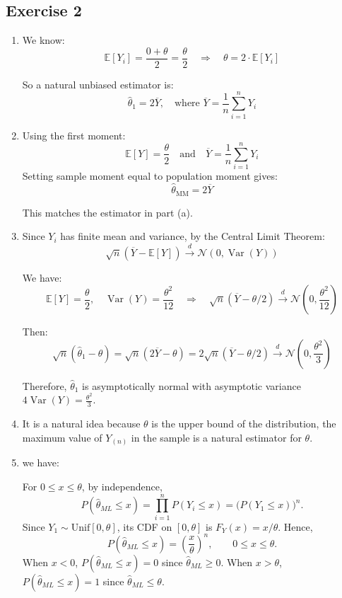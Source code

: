 \documentclass[12pt]{article}
\begin{document}
\begin{flushleft}
\section*{Exercise 2}

\begin{enumerate}[label=(\alph*)]

\item 

We know:
\[
\mathbb{E}[Y_i] = \frac{0 + \theta}{2} = \frac{\theta}{2}
\quad \Rightarrow \quad
\theta = 2 \cdot \mathbb{E}[Y_i]
\]

So a natural unbiased estimator is:
\[
\hat{\theta}_1 = 2 \overline{Y}, \quad \text{where } \overline{Y} = \frac{1}{n} \sum_{i=1}^n Y_i
\]

\item 

Using the first moment:
\[
\mathbb{E}[Y] = \frac{\theta}{2} \quad \text{and} \quad \overline{Y} = \frac{1}{n} \sum_{i=1}^n Y_i
\]
Setting sample moment equal to population moment gives:
\[
\hat{\theta}_{\text{MM}} = 2 \overline{Y}
\]

This matches the estimator in part (a).

\item 

Since \( Y_i \) has finite mean and variance, by the Central Limit Theorem:
\[
\sqrt{n}(\overline{Y} - \mathbb{E}[Y]) \xrightarrow{d} \mathcal{N}\left(0, \operatorname{Var}(Y)\right)
\]

We have:
\[
\mathbb{E}[Y] = \frac{\theta}{2}, \quad \operatorname{Var}(Y) = \frac{\theta^2}{12}
\quad \Rightarrow \quad
\sqrt{n}(\overline{Y} - \theta/2) \xrightarrow{d} \mathcal{N}\left(0, \frac{\theta^2}{12}\right)
\]

Then:
\[
\sqrt{n}(\hat{\theta}_1 - \theta) = \sqrt{n}(2\overline{Y} - \theta) = 2\sqrt{n}(\overline{Y} - \theta/2) \xrightarrow{d} \mathcal{N}\left(0, \frac{\theta^2}{3} \right)
\]

Therefore, \( \hat{\theta}_1 \) is asymptotically normal with asymptotic variance \( 4\operatorname{Var}(Y) = \frac{\theta^2}{3} \).

\item It is a natural idea because $\theta$ is the upper bound of the distribution, the maximum value of $Y_{(n)}$ in the sample is a natural estimator for $\theta$.

\item we have:


For $0\le x\le \theta$, by independence,
\[
P(\hat\theta_{ML} \le x)
= \prod_{i=1}^n P(Y_i \le x)
= \big(P(Y_1 \le x)\big)^n.
\]
Since $Y_1 \sim \mathrm{Unif}[0,\theta]$, its CDF on $[0,\theta]$ is $F_{Y}(x)=x/\theta$. Hence,
\[
P(\hat\theta_{ML} \le x) = \left(\frac{x}{\theta}\right)^n,\qquad 0\le x\le \theta.
\]
When $x<0$, $P(\hat\theta_{ML} \le x)=0$ since $\hat\theta_{ML}\ge 0$. When $x>\theta$, $P(\hat\theta_{ML} \le x)=1$ since $\hat\theta_{ML}\le \theta$.



\end{enumerate}
\end{flushleft}
\end{document}
